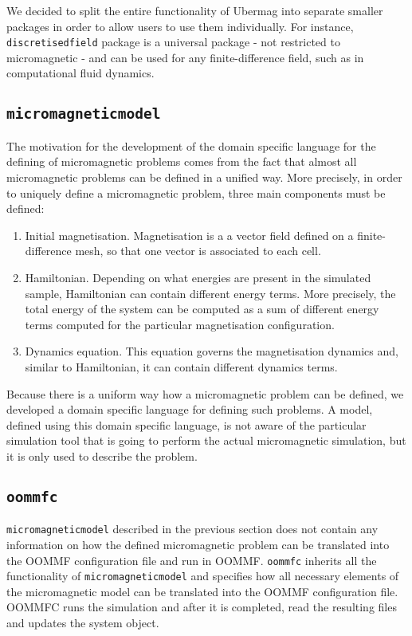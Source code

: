 \documentclass{deliverablereport}
\begin{document}
We decided to split the entire functionality of Ubermag into separate smaller packages in order to allow users to use them individually. For instance, \texttt{discretisedfield} package is a universal package - not restricted to micromagnetic - and can be used for any finite-difference field, such as in computational fluid dynamics. 

\subsection{\texttt{micromagneticmodel}}\label{sec:micromagneticmodel}

The motivation for the development of the domain specific language for the defining of micromagnetic problems comes from the fact that almost all micromagnetic problems can be defined in a unified way. More precisely, in order to uniquely define a micromagnetic problem, three main components must be defined:

\begin{enumerate}
\item Initial magnetisation. Magnetisation is a a vector field defined on a finite-difference mesh, so that one vector is associated to each cell.
\item Hamiltonian. Depending on what energies are present in the simulated sample, Hamiltonian can contain different energy terms. More precisely, the total energy of the system can be computed as a sum of different energy terms computed for the particular magnetisation configuration.
  \item Dynamics equation. This equation governs the magnetisation dynamics and, similar to Hamiltonian, it can contain different dynamics terms.
\end{enumerate}

Because there is a uniform way how a micromagnetic problem can be defined, we developed a domain specific language for defining such problems. A model, defined using this domain specific language, is not aware of the particular simulation tool that is going to perform the actual micromagnetic simulation, but it is only used to describe the problem.

\subsection{\texttt{oommfc}}\label{sec:oommfc}

\texttt{micromagneticmodel} described in the previous section does not contain any information on how the defined micromagnetic problem can be translated into the OOMMF configuration file and run in OOMMF. \texttt{oommfc} inherits all the functionality of \texttt{micromagneticmodel} and specifies how all necessary elements of the micromagnetic model can be translated into the OOMMF configuration file. OOMMFC runs the simulation and after it is completed, read the resulting files and updates the system object.
\end{document}
